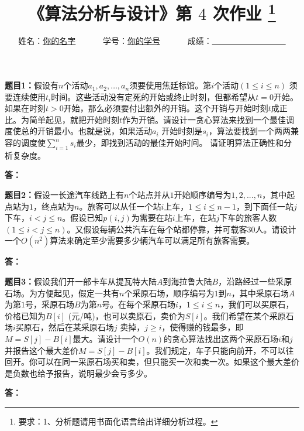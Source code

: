 \documentclass[12pt,a4paper]{article}
\begin{document}
\title{
  {\heiti《算法分析与设计》第 $4$ 次作业
    \footnote{要求：1、分析题请用书面化语言给出详细分析过程。}
    }
}
\date{}

\author{
姓名：\underline{你的名字}~~~~~~
学号：\underline{你的学号}~~~~~~
成绩：\underline{~~~~~~~~~~~~~~~~~~}
}

\maketitle

\noindent
\section*{\bf \color{red}{算法分析题}}
\vspace{10pt}

\noindent
{\bf 题目1：}假设有$n$个活动$a_1,a_2,\dots , a_n$须要使用焦廷标馆。第$i$个活动$(1\leq i\leq n)$ 须要连续使用$t_i$时间。这些活动没有定死的开始或终止时刻，但都希望从$t = 0$开始。如果在时刻$t > 0$开始，那么必须要付出额外的开销。这个开销与开始时刻$t$成正比。为简单起见，就把开始时刻$t$作为开销。请设计一贪心算法来找到一个最佳调度使总的开销最小。也就是说，如果活动$a_i$ 开始时刻是$s_i$，算法要找到一个两两兼容的调度使$\sum_{i=1}^{n} s_i$最少，即找到活动的最佳开始时间。 请证明算法正确性和分析复杂度。

\vspace{5pt}
\noindent
{\bf 答：}

\vspace{10pt}
\noindent
{\bf 题目2：}假设一长途汽车线路上有$n$个站点并从$1$开始顺序编号为$1,2,...,n$，其中起点站为$1$，终点站为$n$。旅客可以从任一个站$i$上车，$1 \leq i \leq n-1$，到下面任一站$j$下车，$i < j \leq n$。假设已知$p(i,j)$为需要在站$i$上车，在站$j$下车的旅客人数$(1 \leq i < j \leq n)$。又假设每辆公共汽车在每个站都停靠，并可载客$30$人。请设计一个$O(n^2)$算法来确定至少需要多少辆汽车可以满足所有旅客需要。

\vspace{5pt}
\noindent
{\bf 答：}

\vspace{10pt}
\noindent
{\bf 题目3：}假设我们开一部卡车从提瓦特大陆$A$到海拉鲁大陆$B$，沿路经过一些采原石场。为方便起见，假定一共有$n$个采原石场，顺序编号为$1$到$n$，其中采原石场$A$为第$1$号，采原石场$B$为第$n$号。在每个采原石场$i$，$1 \leq i \leq n$，我们可以买原石，价格已知为$B[i]$ (元/吨)，也可以卖原石，卖价为$S[i]$。我们希望在某个采原石场$i$买原石，然后在某采原石场$j$ 卖掉，$j \geq i$，使得赚的钱最多，即$M = S[j] - B[i]$最大。请设计一个$O(n)$的贪心算法找出这两个采原石场$i$和$j$并报告这个最大差价$M = S[j] - B[i]$。我们规定，车子只能向前开，不可以往回开。你可以在同一采原石场买和卖，但只能买一次和卖一次。如果这个最大差价是负数也给予报告，说明最少会亏多少。

\vspace{5pt}
\noindent
{\bf 答：}
\end{document}
